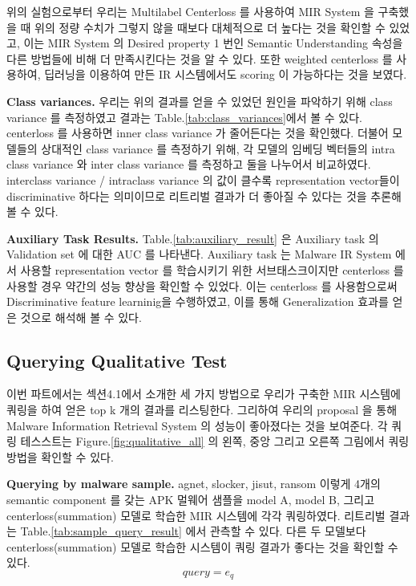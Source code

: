 위의 실험으로부터 우리는 Multilabel Centerloss 를 사용하여 MIR System 을 구축했을 때 위의 정량 수치가 그렇지 않을 때보다 대체적으로 더 높다는 것을 확인할 수 있었고, 이는 MIR System 의 Desired property 1 번인 Semantic Understanding 속성을 다른 방법들에 비해 더 만족시킨다는 것을 알 수 있다. 또한 weighted centerloss 를 사용하여, 딥러닝을 이용하여 만든 IR 시스템에서도 scoring 이 가능하다는 것을 보였다. 


\textbf{Class variances. }
우리는 위의 결과를 얻을 수 있었던 원인을 파악하기 위해 class variance 를 측정하였고 결과는 Table.\ref{tab:class_variances}에서 볼 수 있다. centerloss 를 사용하면 inner class variance 가 줄어든다는 것을 확인했다. 더불어 모델들의 상대적인 class variance 를 측정하기 위해, 각 모델의 임베딩 벡터들의 intra class variance 와 inter class variance 를 측정하고 둘을 나누어서 비교하였다. interclass variance / intraclass variance 의 값이 클수록 representation vector들이 discriminative 하다는 의미이므로 리트리벌 결과가 더 좋아질 수 있다는 것을 추론해볼 수 있다. 

\textbf{Auxiliary Task Results. }
Table.\ref{tab:auxiliary_result} 은 Auxiliary task 의 Validation set 에 대한 AUC 를 나타낸다. Auxiliary task 는 Malware IR System 에서 사용할 representation vector 를 학습시키기 위한 서브태스크이지만 centerloss 를 사용할 경우 약간의 성능 향상을 확인할 수 있었다. 이는 centerloss 를 사용함으로써 Discriminative feature learninig\cite{wen2016discriminative}을 수행하였고, 이를 통해 Generalization 효과를 얻은 것으로 해석해 볼 수 있다.


\subsection{Querying Qualitative Test}
이번 파트에서는 섹션4.1에서 소개한 세 가지 방법으로 우리가 구축한 MIR 시스템에 쿼링을 하여 얻은 top k 개의 결과를 리스팅한다. 그리하여 우리의 proposal 을 통해 Malware Information Retrieval System 의 성능이 좋아졌다는 것을 보여준다. 각 쿼링 테스스트는 Figure.\ref{fig:qualitative_all} 의 왼쪽, 중앙 그리고 오른쪽 그림에서 쿼링 방법을 확인할 수 있다.

\textbf{Querying by malware sample. }
agnet, slocker, jisut, ransom 이렇게 4개의 semantic component 를 갖는 APK 멀웨어 샘플을 model A, model B, 그리고 centerloss(summation) 모델로 학습한 MIR 시스템에 각각 쿼링하였다. 리트리벌 결과는 Table.\ref{tab:sample_query_result} 에서 관측할 수 있다. 다른 두 모델보다 centerloss(summation) 모델로 학습한 시스템이 쿼링 결과가 좋다는 것을 확인할 수 있다. 
\[
   query = e_q 
\]


